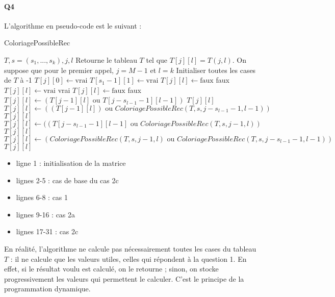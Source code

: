 \documentclass[12pt]{article}
\newcommand{\true}{\text{vrai}}
\newcommand{\false}{\text{faux}}
\begin{document}
			\paragraph{Q4} L'algorithme en pseudo-code est le suivant :
				\begin{algorithm} [H]
					\caption{ColoriagePossibleRec}
					\label{color_poss_rec}
					\begin{algorithmic}[1]
						\REQUIRE $T, s=(s_1,...,s_k), j, l$ 
						\ENSURE Retourne le tableau $ T $ tel que $ T[j][l] = T(j,l) $. On suppose que pour le premier appel, $ j = M-1 $ et $ l = k $
						\STATE Initialiser toutes les cases de $ T $ à -1
							\STATE $ T[j][0] \leftarrow \true $
						\ENDFOR
						\STATE $ T[s_1-1][1] \leftarrow \true $
							\STATE $ T[j][l] \leftarrow \false $
							\RETURN faux
								\STATE $ T[j][l] \leftarrow \true $
								\RETURN vrai
							\ELSE
								\STATE$ T[j][l] \leftarrow \false $
								\RETURN faux
							\ENDIF
						\ELSE
								\STATE $ T[j][l] \leftarrow (T[j-1][l] \text{ ou } T[j-s_{l-1}-1][l-1]) $
								\RETURN $ T[j][l] $
								\STATE $ T[j][l] \leftarrow ((T[j-1][l]) \text{ ou } ColoriagePossibleRec(T,s,j-s_{l-1}-1,l-1)) $
								\RETURN $ T[j][l] $
								\STATE $ T[j][l] \leftarrow ((T[j-s_{l-1}-1][l-1] \text{ ou } ColoriagePossibleRec(T,s,j-1,l)) $
								\RETURN $ T[j][l] $
							\ELSE
								\STATE $ T[j][l] \leftarrow (ColoriagePossibleRec(T,s,j-1,l) \text{ ou } ColoriagePossibleRec(T,s,j-s_{l-1}-1,l-1)) $
								\RETURN $ T[j][l] $
							\ENDIF
						\ENDIF
					\end{algorithmic}
				\end{algorithm}
		
				\begin{itemize}
					\item ligne 1 : initialisation de la matrice
					\item lignes 2-5 : cas de base du cas 2c
					\item lignes 6-8 : cas 1
					\item lignes 9-16 : cas 2a
					\item lignes 17-31 : cas 2c
				\end{itemize}
	
				En réalité, l'algorithme ne calcule pas nécessairement toutes les cases du tableau $ T $ : il ne calcule que les valeurs utiles, celles qui répondent à la question 1. En effet, si le résultat voulu est calculé, on le retourne ; sinon, on stocke progressivement les valeurs qui permettent le calculer. C'est le principe de la programmation dynamique.
		
\end{document}
